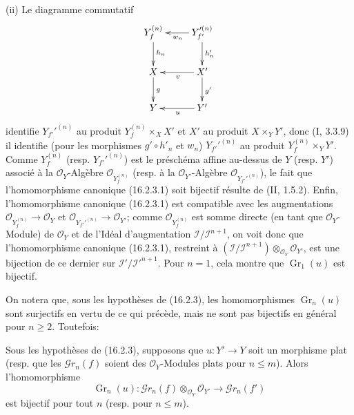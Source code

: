 \noindent(ii) Le diagramme commutatif
\[
  \xymatrix{
    Y_f^{(n)} \ar[d]^{h_n}
      & Y_{f'}'^{(n)} \ar[d]^-{h'_n} \ar[l]^{w_n} \\
    X \ar[d]^g
      & X' \ar[d]^{g'} \ar[l]^v \\
    Y
      & Y' \ar[l]^u
  }
\]
identifie $Y_{f'}'^{(n)}$ au produit $Y_f^{(n)}\times_X X'$ et $X'$ au produit
$X\times_Y Y'$, donc (I, 3.3.9) il identifie (pour les morphismes
$g'\circ h'_n$ et $w_n$) $Y_{f'}'^{(n)}$ au produit
$Y_f^{(n)}\times_Y Y'$. Comme $Y_f^{(n)}$ (resp. $Y_{f'}'^{(n)}$) est le
préschéma affine au-dessus de $Y$ (resp. $Y'$) associé à la
$\mathcal{O}_Y$-Algèbre $\mathcal{O}_{Y_f^{(n)}}$ (resp. à la
$\mathcal{O}_{Y'}$-Algèbre $\mathcal{O}_{Y_{f'}'^{(n)}}$), le fait que
l'homomorphisme canonique (16.2.3.1) soit bijectif résulte de (II, 1.5.2).
Enfin, l'homomorphisme canonique (16.2.3.1) est compatible avec les
augmentations
$\mathcal{O}_{Y_f^{(n)}}\to\mathcal{O}_Y$ et
$\mathcal{O}_{Y_{f'}'^{(n)}}\to\mathcal{O}_{Y'}$; comme
$\mathcal{O}_{Y_f^{(n)}}$ est somme directe (en tant que
$\mathcal{O}_Y$-Module) de $\mathcal{O}_Y$ et de l'Idéal d'augmentation
$\mathscr{I}/\mathscr{I}^{n+1}$, on voit donc que l'homomorphisme canonique
(16.2.3.1), restreint à
$(\mathscr{I}/\mathscr{I}^{n+1})\otimes_{\mathcal{O}_Y}\mathcal{O}_{Y'}$,
est une bijection de ce dernier sur
$\mathscr{I}'/\mathscr{I}'^{n+1}$. Pour $n=1$, cela montre que
$\operatorname{Gr}_1(u)$ est bijectif.

On notera que, sous les hypothèses de (16.2.3), les homomorphismes
$\operatorname{Gr}_n(u)$ sont surjectifs en vertu de ce qui précède, mais ne
sont pas bijectifs en général pour $n\geq 2$. Toutefois:

\begin{corollary}[16.2.4]
\label{IV.16.2.4}
Sous les hypothèses de (16.2.3), supposons que $u:Y'\to Y$ soit un morphisme
plat (resp. que les $\mathscr{G}r_n(f)$ soient des $\mathcal{O}_Y$-Modules
plats pour $n\leq m$). Alors l'homomorphisme
\[
  \operatorname{Gr}_n(u):
  \mathscr{G}r_n(f)\otimes_{\mathcal{O}_Y}\mathcal{O}_{Y'}
  \longrightarrow\mathscr{G}r_n(f')
\]
est bijectif pour tout $n$ (resp. pour $n\leq m$).
\end{corollary}

